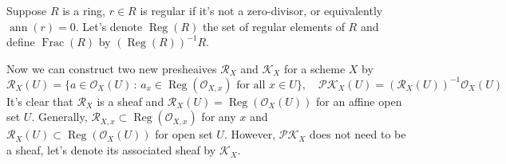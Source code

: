 \begin{defi}
Suppose $R$ is a ring, $r\in R$ is regular if it's not a zero-divisor, 
or equivalently $\operatorname{ann}(r)=0$. Let's denote $\operatorname{Reg}(R)$
the set of regular elements of $R$ and define $\operatorname{Frac}(R)$ by
$(\operatorname{Reg}(R))^{-1}R$.
\end{defi}

Now we can construct two new presheaives $\mathcal R_X$ and $\mathcal K_X$ for a 
scheme $X$ by 
\[
	\mathcal R_X(U)=\{a\in \mathcal O_X(U)\,:\, a_x\in 
	\operatorname{Reg}(\mathcal O_{X,x})\text{ for all $x\in U$}\},
	\quad \mathcal{PK}_X(U)= (\mathcal R_X(U))^{-1}\mathcal O_X(U)
\]
It's clear that $\mathcal R_X$ is a sheaf and 
$\mathcal R_X(U)=\operatorname{Reg}(\mathcal O_X(U))$ for an affine open set $U$.
Generally, 
$\mathcal R_{X,x} \subset \operatorname{Reg}(\mathcal O_{X,x})$ for any $x$ and 
$\mathcal R_X(U)\subset \operatorname{Reg}(\mathcal O_X(U))$
for open set $U$.
However, $\mathcal{PK}_X$ does not need to be a sheaf, let's denote its 
associated sheaf by $\mathcal K_X$.




